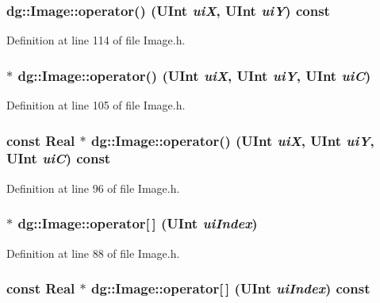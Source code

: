 \subsubsection{ dg::Image::operator() ({\bf UInt} {\em ui\-X}, {\bf UInt} {\em ui\-Y}) const\hspace{0.3cm}{\tt  [inline]}}\label{classdg_1_1Image_a6}




Definition at line 114 of file Image.h.
\subsubsection{ $\ast$ dg::Image::operator() ({\bf UInt} {\em ui\-X}, {\bf UInt} {\em ui\-Y}, {\bf UInt} {\em ui\-C})\hspace{0.3cm}{\tt  [inline]}}\label{classdg_1_1Image_a5}




Definition at line 105 of file Image.h.
\subsubsection{\setlength{\rightskip}{0pt plus 5cm}const {\bf Real} $\ast$ dg::Image::operator() ({\bf UInt} {\em ui\-X}, {\bf UInt} {\em ui\-Y}, {\bf UInt} {\em ui\-C}) const\hspace{0.3cm}{\tt  [inline]}}\label{classdg_1_1Image_a4}




Definition at line 96 of file Image.h.
\subsubsection{ $\ast$ dg::Image::operator[$\,$] ({\bf UInt} {\em ui\-Index})\hspace{0.3cm}{\tt  [inline]}}\label{classdg_1_1Image_a3}




Definition at line 88 of file Image.h.
\subsubsection{\setlength{\rightskip}{0pt plus 5cm}const {\bf Real} $\ast$ dg::Image::operator[$\,$] ({\bf UInt} {\em ui\-Index}) const\hspace{0.3cm}{\tt  [inline]}}\label{classdg_1_1Image_a2}




